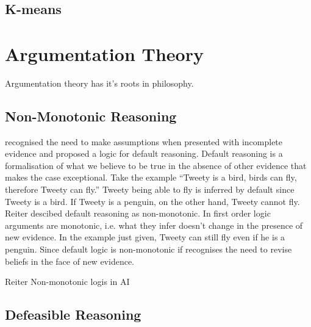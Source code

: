 \subsection{K-means}


\section{Argumentation Theory}

Argumentation theory has it's roots in philosophy.

\subsection{Non-Monotonic Reasoning}

\cite{reiter1980logic} recognised the need to make assumptions when presented with incomplete evidence and proposed a logic for default reasoning. Default reasoning is a formalisation of what we believe to be true in the absence of other evidence that makes the case exceptional.
Take the example “Tweety is a bird, birds can fly, therefore Tweety can fly.” Tweety being able to fly is inferred by default since Tweety is a bird. If Tweety is a penguin, on the other hand, Tweety cannot fly. Reiter descibed default reasoning as non-monotonic. In first order logic arguments are monotonic, i.e. what they infer doesn’t change in the presence of new evidence. In the example just given, Tweety can still fly even if he is a penguin. Since default logic is non-monotonic if recognises the need to revise beliefs in the face of new evidence.

Reiter Non-monotonic logis in AI




\subsection{Defeasible Reasoning}

